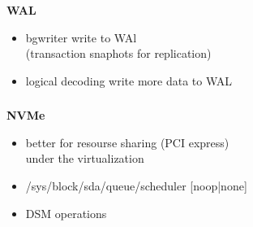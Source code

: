 \documentclass[usenames,dvipsnames, 18pt, compress, aspectratio=169]{beamer}
\begin{document}
\begin{frame}
\begin{center}
{
        }

    \end{center}
\end{frame}

\begin{frame}
    \frametitle{}
    \begin{center}
    \textbf{WAL}

        \begin{itemize}[label={\MVRightarrow}]
            \item bgwriter write to WAl \\
                (transaction snaphots for replication)
            \item logical decoding write more data to WAL
        \end{itemize}

    \end{center}
\end{frame}

\begin{frame}
    \frametitle{}
    \begin{center}
    \textbf{NVMe}

        \begin{itemize}[label={\MVRightarrow}]
            \item better for resourse sharing (PCI express) \\
                under the virtualization
            \item /sys/block/sda/queue/scheduler [noop|none]
            \item DSM operations
        \end{itemize}

    \end{center}
\end{frame}
\end{document}
